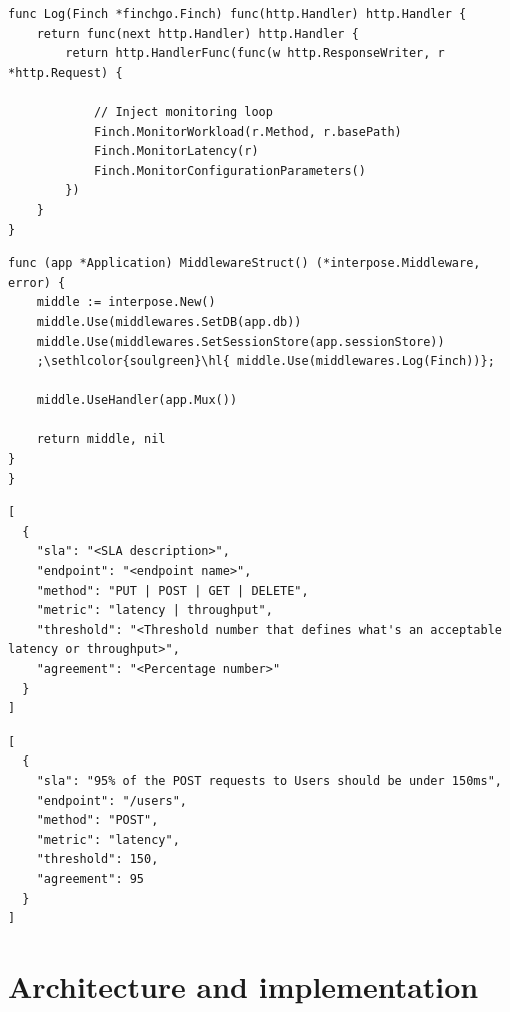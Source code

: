 \begin{lstlisting}[float,floatplacement=H,escapechar=;,caption={Defining logging middleware for Finch's logging},label={lst:finchlog}]
func Log(Finch *finchgo.Finch) func(http.Handler) http.Handler {
	return func(next http.Handler) http.Handler {
		return http.HandlerFunc(func(w http.ResponseWriter, r *http.Request) {

			// Inject monitoring loop
			Finch.MonitorWorkload(r.Method, r.basePath)
			Finch.MonitorLatency(r)
			Finch.MonitorConfigurationParameters()
		})
	}
}
\end{lstlisting}

\begin{lstlisting}[float,floatplacement=H,escapechar=;,caption={Injecting Finch's logging middleware into target system's HTTP middleware},label={lst:middleware}]
func (app *Application) MiddlewareStruct() (*interpose.Middleware, error) {
	middle := interpose.New()
	middle.Use(middlewares.SetDB(app.db))
	middle.Use(middlewares.SetSessionStore(app.sessionStore))
	;\sethlcolor{soulgreen}\hl{	middle.Use(middlewares.Log(Finch))};

	middle.UseHandler(app.Mux())

	return middle, nil
}
}
\end{lstlisting}

\begin{lstlisting}[float,floatplacement=H,caption={finch\_sla.json describe each SLA in the target system},label={lst:finchsla}]
[
  {
    "sla": "<SLA description>",
    "endpoint": "<endpoint name>",
    "method": "PUT | POST | GET | DELETE",
    "metric": "latency | throughput",
    "threshold": "<Threshold number that defines what's an acceptable latency or throughput>",
    "agreement": "<Percentage number>"
  }
]
\end{lstlisting}

\begin{lstlisting}[float,floatplacement=H,caption={Example of an SLA definition in finch\_sla.json},label={lst:finchslaexample}]
[
  {
    "sla": "95% of the POST requests to Users should be under 150ms",
    "endpoint": "/users",
    "method": "POST",
    "metric": "latency",
    "threshold": 150,
    "agreement": 95
  }
]
\end{lstlisting}

\section{Architecture and implementation}


